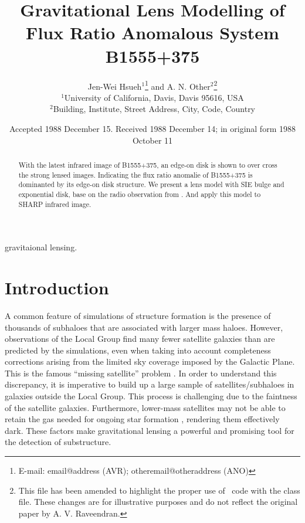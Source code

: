 \documentclass[useAMS,usenatbib]{mn2e}
\title[Beware the Effect of Edge-on Disks]{Gravitational Lens Modelling of Flux Ratio Anomalous System B1555+375}
\author[Jen-Wei Hsueh and A. N. Other]{Jen-Wei Hsueh$^{1}$\thanks{E-mail:
email@address (AVR); otheremail@otheraddress (ANO)} and A. N.
Other$^{2}$\footnotemark[1]\thanks{This file has been amended to
highlight the proper use of \LaTeXe\ code with the class file.
These changes are for illustrative purposes and do not reflect the
original paper by A. V. Raveendran.}\\
$^{1}$University of California, Davis, Davis 95616, USA\\
$^{2}$Building, Institute, Street Address, City, Code, Country}
\begin{document}
\date{Accepted 1988 December 15. Received 1988 December 14; in original form 1988 October 11}

\pagerange{\pageref{firstpage}--\pageref{lastpage}} 

\maketitle

\label{firstpage}

\begin{abstract}
With the latest infrared image of B1555+375, an edge-on disk is shown to over cross the strong lensed images. Indicating the flux ratio anomalie of B1555+375 is dominanted by its edge-on disk structure. We present a lens model with SIE bulge and exponential disk, base on the radio observation from \citet{Marlow}. And apply this model to SHARP infrared image.
\end{abstract}

\begin{keywords}
gravitaional lensing.
\end{keywords}

\section{Introduction}

	A common feature of simulations of structure formation is the presence
of thousands of subhaloes that are associated with larger mass haloes.
However, observations of the Local Group find many fewer satellite
galaxies than are predicted by the simulations, even when taking into
account completeness corrections arising from the limited sky coverage
imposed by the Galactic Plane.  This is the famous ``missing
satellite'' problem \citep{Klypin1999, Moore1999, S07}. In order to understand
this discrepancy, it is imperative to build up a large sample of satellites/subhaloes in galaxies outside the Local Group.  
This process is challenging
due to the faintness of the satellite galaxies.  Furthermore, lower-mass
satellites may not be able to retain the gas needed for ongoing star
formation \citep[e.g.,][]{P11}, rendering them effectively dark.
These factors make gravitational lensing a powerful and promising tool for the detection of substructure.
\end{document}
